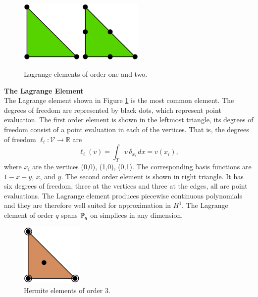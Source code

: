 \begin{figure}
  \begin{center}
    \includegraphics[height=3cm]{chapters/kirby-6/pdf/P1.pdf} \hspace{1.0cm}
    \includegraphics[height=3cm]{chapters/kirby-6/pdf/P2.pdf} \hspace{1.0cm}
    \caption{Lagrange elements of order one and two.}
    \label{Lagrange}
  \end{center}
\end{figure}

\begin{example}{\bf{The Lagrange Element}} \\
The Lagrange element shown in Figure \ref{Lagrange} is the most common
element.  The degrees of freedom are represented by black dots, which
represent point evaluation.  The first order element is shown in the
leftmost triangle, its degrees of freedom consist of a point evaluation
in each of the vertices.  That is, the degrees of freedom $\ell_i :
\mathcal{V} \rightarrow \mathbb{R}$ are
\begin{equation}
\ell_i ( v) = \int_{T} v \, \delta_{x_i} \, dx = v(x_i),
\end{equation}
where $x_i$ are the vertices (0,0), (1,0), (0,1).  The corresponding basis
functions are $1-x-y$, $x$, and $y$.  The second order element is shown
in right triangle. It has six degrees of freedom, three at the vertices
and three at the edges, all are point evaluations.  The Lagrange element
produces piecewise continuous polynomials and they are therefore well
suited for approximation in $H^1$.  The Lagrange element of order $q$
spans $\P_q$ on simplices in any dimension.
\end{example}

\begin{figure}
  \begin{center}
    \includegraphics[height=3cm]{chapters/kirby-6/pdf/HER3.pdf}
    \caption{Hermite elements of order 3.}
    \label{Hermite}
  \end{center}
\end{figure}

